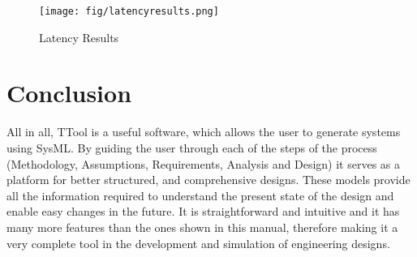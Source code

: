 \documentclass[12pt]{article}
\begin{document}
\begin{figure*}[htbp]
\centering
\texttt{[image: fig/latencyresults.png]}
\caption{Latency Results} \label{fig:latencyresults}
\end{figure*}


\section{Conclusion}

	All in all, TTool is a useful software, which allows the user to generate systems using SysML. By guiding the user through each of the steps of the process (Methodology, Assumptions, Requirements, Analysis and Design) it serves as a platform for better structured, and comprehensive designs. These models provide all the information required to understand the present state of the design and enable easy changes in the future. It is straightforward and intuitive and it has many more features than the ones shown in this manual, therefore making it a very complete tool in the development and simulation of engineering designs. 
	
\end{document}
